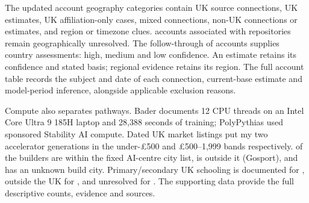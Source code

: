 The updated account geography categories contain
\UKSourceConnectionAccounts{} UK source connections,
\UKEstimateAccounts{} UK estimates, \UKAffiliationAccounts{} UK affiliation-only
cases, \MixedConnectionAccounts{} mixed connections,
\NonUKConnectionOrEstimateAccounts{} non-UK connections or estimates, and
\RegionClueAccounts{} region or timezone clues.
\UnresolvedGeographyAccounts{} accounts associated with
\UnresolvedGeographyModels{} repositories remain geographically unresolved.
The follow-through of \FollowthroughAccounts{} accounts supplies
\CountryEstimateAccounts{} country assessments: \HighCountryEstimateAccounts{}
high, \MediumCountryEstimateAccounts{} medium and \LowCountryEstimateAccounts{}
low confidence. An estimate retains its confidence and stated basis;
regional evidence retains its region. The full account table records
the subject and date of each connection, current-base estimate and
model-period inference, alongside applicable exclusion reasons.

Compute also separates pathways. Bader documents 12 CPU threads on an
Intel Core Ultra 9 185H laptop and 28,388 seconds of training; PolyPythias
used sponsored Stability AI compute. Dated UK market listings put my
two accelerator generations in the under-\pounds500 and \pounds500--1,999
bands respectively. \InsideAICentreBuilders{} of the \UKBuilders{} builders are within the fixed
AI-centre city list, \OutsideAICentreBuilders{} is outside it (Gosport), and
\UnknownBuildCityBuilders{} has an unknown build city. Primary/secondary UK
schooling is documented for \UKSchoolingBuilders{}, outside the UK for
\NonUKSchoolingBuilders{}, and unresolved for \UnknownSchoolingBuilders{}.
The supporting data provide the
full descriptive counts, evidence and sources.
